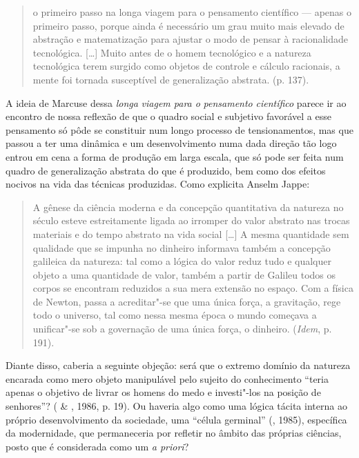 \begin{quote}
o primeiro passo na longa viagem para o pensamento científico --- apenas
o primeiro passo, porque ainda é necessário um grau muito mais elevado
de abstração e matematização para ajustar o modo de pensar à
racionalidade tecnológica. [\ldots{}] Muito antes de o homem tecnológico
e a natureza tecnológica terem surgido como objetos de controle e
cálculo racionais, a mente foi tornada susceptível de generalização
abstrata. (p. 137).
\end{quote}

A ideia de Marcuse dessa \emph{longa} \emph{viagem para o}
\emph{pensamento} \emph{científico} parece ir ao encontro de nossa
reflexão de que o quadro social e subjetivo favorável a esse pensamento
só pôde se constituir num longo processo de tensionamentos, mas que
passou a ter uma dinâmica e um desenvolvimento numa dada direção tão
logo entrou em cena a forma de produção em larga escala, que só pode ser
feita num quadro de generalização abstrata do que é produzido, bem como
dos efeitos nocivos na vida das técnicas produzidas. Como explicita
Anselm Jappe:

\begin{quote}
A gênese da ciência moderna e da concepção quantitativa da natureza no
século  esteve estreitamente ligada ao irromper do valor abstrato
nas trocas materiais e do tempo abstrato na vida social [\ldots{}] A
mesma quantidade sem qualidade que se impunha no dinheiro informava
também a concepção galileica da natureza: tal como a lógica do valor
reduz tudo e qualquer objeto a uma quantidade de valor, também a partir
de Galileu todos os corpos se encontram reduzidos a sua mera extensão no
espaço. Com a física de Newton, passa a acreditar"-se que uma única
força, a gravitação, rege todo o universo, tal como nessa mesma época o
mundo começava a unificar"-se sob a governação de uma única força, o
dinheiro. (\emph{Idem}, p. 191).
\end{quote}

Diante disso, caberia a seguinte objeção: será que o extremo domínio da
natureza encarada como mero objeto manipulável pelo sujeito do
conhecimento ``teria apenas o objetivo de livrar os homens do medo e
investi"-los na posição de senhores''? ( \& , 1986, p.
19). Ou haveria algo como uma lógica tácita interna ao próprio
desenvolvimento da sociedade, uma ``célula germinal'' (, 1985),
específica da modernidade, que permaneceria por refletir no âmbito das
próprias ciências, posto que é considerada como um \emph{a priori}?

